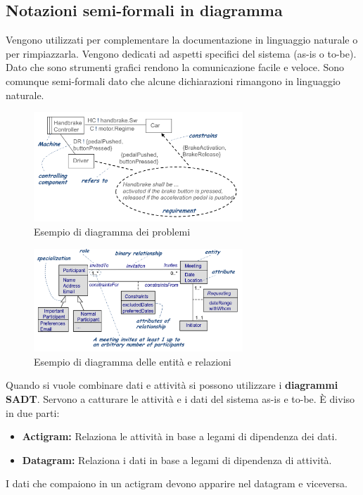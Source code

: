 \documentclass[../main.tex]{subfiles}
\begin{document}
\subsection{Notazioni semi-formali in diagramma}
Vengono utilizzati per complementare la documentazione in linguaggio naturale o per rimpiazzarla.
Vengono dedicati ad aspetti specifici del sistema (as-is o to-be).
Dato che sono strumenti grafici rendono la comunicazione facile e veloce.
Sono comunque semi-formali dato che alcune dichiarazioni rimangono in linguaggio naturale.
\begin{figure}[hbt]
	\centering
	\includegraphics[width=0.7\textwidth]{pictures/DiagrammiProblema.png}
	\caption{Esempio di diagramma dei problemi}
\end{figure}
\begin{figure}[hbt]
	\centering
	\includegraphics[width=0.7\textwidth]{pictures/ER.png}
	\caption{Esempio di diagramma delle entità e relazioni}
\end{figure}
\noindent
Quando si vuole combinare dati e attività si possono utilizzare i \textbf{diagrammi SADT}.
Servono a catturare le attività e i dati del sistema as-is e to-be.
È diviso in due parti:
\begin{itemize}
	\item \textbf{Actigram:} Relaziona le attività in base a legami di dipendenza dei dati.
	\item \textbf{Datagram:} Relaziona i dati in base a legami di dipendenza di attività. 
\end{itemize}
I dati che compaiono in un actigram devono apparire nel datagram e viceversa.
\end{document}
